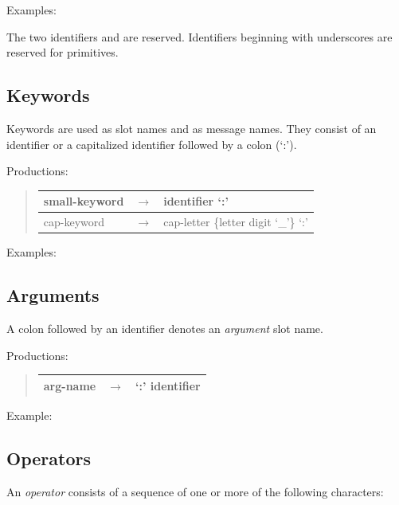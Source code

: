 \documentclass[letterpaper,10pt,english]{sphinxmanual}
\begin{document}
Examples: 

The two identifiers  and  are reserved. Identifiers beginning with underscores are reserved for primitives.


\subsection{Keywords}
\label{langref:keywords}\label{langref:index-61}
Keywords are used as slot names and as message names. They consist of an identifier or a capitalized identifier followed by a colon (‘:’).

Productions:
\begin{quote}

\begin{tabulary}{\linewidth}{|L|L|L|}
\hline

small-keyword
 & 
\(\rightarrow\)
 & 
identifier ‘:’
\\\hline

cap-keyword
 & 
\(\rightarrow\)
 & 
cap-letter \{letter \textbar{} digit \textbar{} ‘\_’\} ‘:’
\\\hline
\end{tabulary}

\end{quote}

Examples:   


\subsection{Arguments}
\label{langref:index-62}\label{langref:arguments}
A colon followed by an identifier denotes an \emph{argument} slot name.

Productions:
\begin{quote}

\begin{tabulary}{\linewidth}{|L|L|L|}
\hline

arg-name
 & 
\(\rightarrow\)
 & 
‘:’ identifier
\\\hline
\end{tabulary}

\end{quote}

Example: 


\subsection{Operators}
\label{langref:operators}\label{langref:index-63}
An \emph{operator} consists of a sequence of one or more of the following characters:
\end{document}
